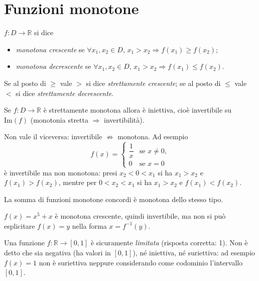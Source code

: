 \documentclass[11pt,a4paper]{article}
\begin{document}
\section{Funzioni monotone}

\begin{definizione}
$f : D \to \mathbb{R}$ si dice
\begin{itemize}
    \item \emph{monotona crescente} se $\forall x_1, x_2 \in D$, $x_1 > x_2 \Rightarrow f(x_1) \geq f(x_2)$;
    \item \emph{monotona decrescente} se $\forall x_1, x_2 \in D$, $x_1 > x_2 \Rightarrow f(x_1) \leq f(x_2)$.
\end{itemize}
Se al posto di $\geq$ vale $>$ si dice \emph{strettamente crescente}; se al posto di $\leq$ vale $<$ si dice \emph{strettamente decrescente}.
\end{definizione}

\begin{proposizione}
Se $f : D \to \mathbb{R}$ è strettamente monotona allora è iniettiva, cioè invertibile su $\mathrm{Im}(f)$ (monotonia stretta $\Rightarrow$ invertibilità).
\end{proposizione}

Non vale il viceversa: invertibile $\not\Rightarrow$ monotona. Ad esempio
\[
f(x) = \begin{cases} \dfrac{1}{x} & \text{se } x \neq 0, \\[4pt] 0 & \text{se } x = 0 \end{cases}
\]
è invertibile ma non monotona: presi $x_2 < 0 < x_1$ si ha $x_1 > x_2$ e $f(x_1) > f(x_2)$, mentre per $0 < x_2 < x_1$ si ha $x_1 > x_2$ e $f(x_1) < f(x_2)$.

\begin{osservazione}
La somma di funzioni monotone concordi è monotona dello stesso tipo.
\end{osservazione}

\begin{esempio}
$f(x) = x^5 + x$ è monotona crescente, quindi invertibile, ma non si può esplicitare $f(x) = y$ nella forma $x = f^{-1}(y)$.
\end{esempio}

\begin{esempio}[Test]
Una funzione $f : \mathbb{R} \to [0,1]$ è sicuramente \emph{limitata} (risposta corretta: 1). Non è detto che sia negativa (ha valori in $[0,1]$), né iniettiva, né suriettiva: ad esempio $f(x) = 1$ non è suriettiva neppure considerando come codominio l'intervallo $[0,1]$.
\end{esempio}
\end{document}

